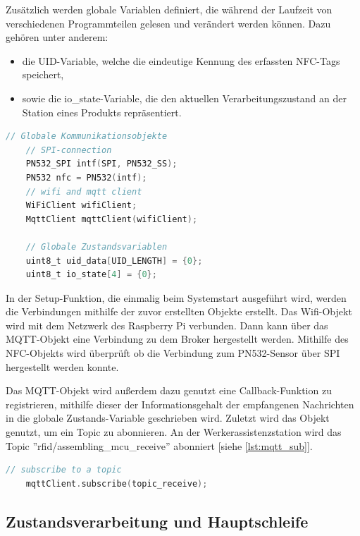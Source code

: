 Zusätzlich werden globale Variablen definiert, die während der Laufzeit von verschiedenen Programmteilen gelesen und verändert werden können. Dazu gehören unter anderem:

\begin{itemize}
	\item die UID-Variable, welche die eindeutige Kennung des erfassten NFC-Tags speichert,
	\item sowie die io\_state-Variable, die den aktuellen Verarbeitungszustand an der Station eines Produkts repräsentiert.
\end{itemize}

\newpage

\begin{lstlisting}[language=C, caption={Initialisierung globaler Objekte und Variablen}, label={lst:init_globals}]
	// Globale Kommunikationsobjekte
	// SPI-connection
	PN532_SPI intf(SPI, PN532_SS);
	PN532 nfc = PN532(intf);
	// wifi and mqtt client 
	WiFiClient wifiClient;
	MqttClient mqttClient(wifiClient);
	
	// Globale Zustandsvariablen
	uint8_t uid_data[UID_LENGTH] = {0};
	uint8_t io_state[4] = {0};
\end{lstlisting}


In der Setup-Funktion, die einmalig beim Systemstart ausgeführt wird, werden die Verbindungen mithilfe der zuvor erstellten Objekte erstellt. Das Wifi-Objekt wird mit dem Netzwerk des Raspberry Pi verbunden. Dann kann über das MQTT-Objekt eine Verbindung zu dem Broker hergestellt werden. Mithilfe des NFC-Objekts wird überprüft ob die Verbindung zum PN532-Sensor über SPI hergestellt werden konnte. 

Das MQTT-Objekt wird außerdem dazu genutzt eine Callback-Funktion zu registrieren, mithilfe dieser der Informationsgehalt der empfangenen Nachrichten in die globale Zustands-Variable geschrieben wird. Zuletzt wird das Objekt genutzt, um ein Topic zu abonnieren. An der Werkerassistenzstation wird das Topic ''rfid/assembling\_mcu\_receive'' abonniert [siehe \autoref{lst:mqtt_sub}]. 

\begin{lstlisting}[language=C, caption={Abonnieren des MQTT-Topics in der Setup-Funktion}, label={lst:mqtt_sub}]
	// subscribe to a topic
	mqttClient.subscribe(topic_receive);
\end{lstlisting}

\subsection*{Zustandsverarbeitung und Hauptschleife}

